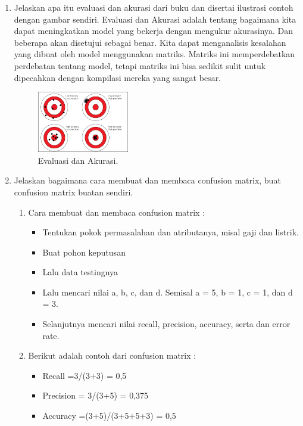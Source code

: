 \begin{enumerate}
	\item Jelaskan apa itu evaluasi dan akurasi dari buku dan disertai ilustrasi contoh dengan gambar sendiri.
	\hfill\break
	Evaluasi dan Akurasi adalah tentang bagaimana kita dapat meningkatkan model yang bekerja dengan mengukur akurasinya. Dan beberapa akan disetujui sebagai benar. Kita dapat menganalisis kesalahan yang dibuat oleh model menggunakan matriks. Matriks ini memperdebatkan perdebatan tentang model, tetapi matriks ini bisa sedikit sulit untuk dipecahkan dengan kompilasi mereka yang sangat besar.

	\begin{figure}[H]
	\centering
		\includegraphics[width=4cm]{figures/1174095/tugas2/materi/5.png}
		\caption{Evaluasi dan Akurasi.}
	\end{figure}

	\item Jelaskan bagaimana cara membuat dan membaca confusion matrix, buat confusion matrix buatan sendiri.
	\hfill\break
	\begin{enumerate}
	\item Cara membuat dan membaca confusion matrix :
	\begin{itemize}
	\item Tentukan pokok permasalahan dan atributanya, misal gaji dan listrik.
	\item Buat pohon keputusan
	\item Lalu data testingnya
	\item Lalu mencari nilai a, b, c, dan d. Semisal a = 5, b = 1, c = 1, dan d = 3.
	\item Selanjutnya mencari nilai recall, precision, accuracy, serta dan error rate.
	\end{itemize}
	\item Berikut adalah contoh dari confusion matrix :
	\begin{itemize}
	\item Recall =3/(3+3) = 0,5
	\item Precision = 3/(3+5) = 0,375
	\item Accuracy =(3+5)/(3+5+5+3) = 0,5
	\end{itemize}
	\end{enumerate}


\end{enumerate}
